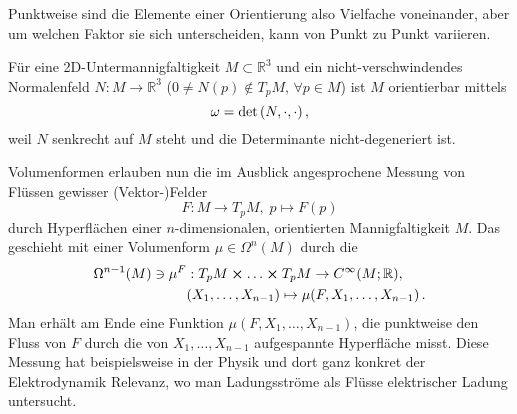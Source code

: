 \documentclass[../H_Analysis_main.tex]{subfiles}
\begin{document}
Punktweise sind die Elemente einer Orientierung also Vielfache voneinander, aber um welchen Faktor sie sich unterscheiden, kann von Punkt zu Punkt variieren.






\begin{bsp}
Für eine 2D-Untermannigfaltigkeit $M \subset \mathbb{R}^3$ und ein nicht-verschwindendes Normalenfeld $N: M \rightarrow \mathbb{R}^3$ ($0 \neq N(p) \notin T_p M, \, \forall p \in M$) ist $M$ orientierbar mittels
\begin{equation}
\omega = \det\qty(N, \cdot, \cdot) \, ,
\end{equation}
weil $N$ senkrecht auf $M$ steht und die Determinante nicht-degeneriert ist.
\end{bsp}

\begin{bsp}[Flussform]
Volumenformen erlauben nun die im Ausblick angesprochene Messung von Flüssen gewisser (Vektor-)Felder 
\begin{equation*}
F: M \rightarrow T_p M, \; p \mapsto F(p)
\end{equation*}
durch Hyperflächen einer $n$-dimensionalen, orientierten Mannigfaltigkeit $M$. Das geschieht mit einer Volumenform $\mu \in \Omega^n(M)$ durch die 
\begin{equation}
\begin{split}
\Omega^{n - 1}(M) \ni \mu^F&: T_p M \cross \dots \cross T_p M \rightarrow C^\infty(M; \mathbb{R}),  
\\
&(X_1, \dots,X_{n - 1}) \mapsto \mu(F, X_1, \dots, X_{n - 1}) \, .
\end{split}
\end{equation}
Man erhält am Ende eine Funktion $\mu(F, X_1, \dots, X_{n - 1})$, die punktweise den Fluss von $F$ durch die von $X_1, \dots, X_{n - 1}$ aufgespannte Hyperfläche misst. Diese Messung hat beispielsweise in der Physik und dort ganz konkret der Elektrodynamik Relevanz, wo man Ladungsströme als Flüsse elektrischer Ladung untersucht.
\end{bsp}
\end{document}
